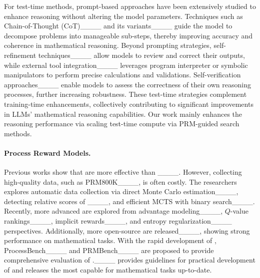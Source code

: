 For test-time methods, prompt-based approaches have been extensively studied to enhance reasoning without altering the model parameters. Techniques such as Chain-of-Thought (CoT)____ and its variants____ guide the model to decompose problems into manageable sub-steps, thereby improving accuracy and coherence in mathematical reasoning. Beyond prompting strategies, self-refinement techniques____ allow models to review and correct their outputs, while external tool integration____ leverages program interpreter or symbolic manipulators to perform precise calculations and validations.
Self-verification approaches____ enable models to assess the correctness of their own reasoning processes, further increasing robustness.
These test-time strategies complement training-time enhancements, collectively contributing to significant improvements in LLMs' mathematical reasoning capabilities. Our work mainly enhances the reasoning performance via scaling test-time compute via PRM-guided search methods.

\paragraph{Process Reward Models.}

Previous works show that \PRMs are more effective than \ORMs____. However, collecting high-quality \PRMs data, such as PRM800K____, is often costly. 
The researchers explores automatic \PRM data collection via direct Monte Carlo estimation____, detecting relative scores of \ORMs____, and efficient MCTS with binary search____.
Recently, more advanced \PRMs are explored from advantage modeling____, $Q$-value rankings____, implicit rewards____, and entropy regularization____ perspectives. Additionally, more open-source \PRMs are released____, showing strong performance on mathematical tasks. With the rapid development of \PRMs, ProcessBench____ and PRMBench____ are proposed to provide comprehensive evaluation of \PRMs.____ provides guidelines for practical development of \PRMs and releases the most capable \PRMs for mathematical tasks up-to-date.

